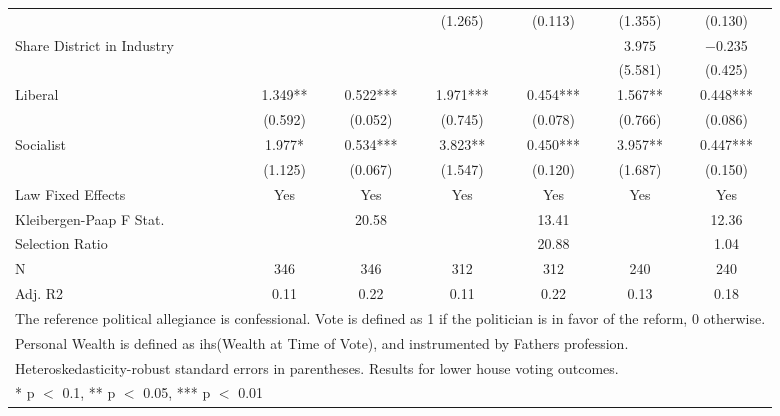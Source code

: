 \begin{table}[!h]
{\begin{tabular}[t]{lcccccc}
 &  &  & (\num{1.265}) & (\num{0.113}) & (\num{1.355}) & (\num{0.130})\\
Share District in Industry &  &  &  &  & \num{3.975} & \num{-0.235}\\
 &  &  &  &  & (\num{5.581}) & (\num{0.425})\\
Liberal & \num{1.349}** & \num{0.522}*** & \num{1.971}*** & \num{0.454}*** & \num{1.567}** & \num{0.448}***\\
 & (\num{0.592}) & (\num{0.052}) & (\num{0.745}) & (\num{0.078}) & (\num{0.766}) & (\num{0.086})\\
Socialist & \num{1.977}* & \num{0.534}*** & \num{3.823}** & \num{0.450}*** & \num{3.957}** & \num{0.447}***\\
 & (\num{1.125}) & (\num{0.067}) & (\num{1.547}) & (\num{0.120}) & (\num{1.687}) & (\num{0.150})\\
\midrule
Law Fixed Effects & Yes & Yes & Yes & Yes & Yes & Yes\\
Kleibergen-Paap F Stat. &  & 20.58 &  & 13.41 &  & 12.36\\
Selection Ratio &  &  &  & 20.88 &  & 1.04\\
N & \num{346} & \num{346} & \num{312} & \num{312} & \num{240} & \num{240}\\
Adj. R2 & \num{0.11} & \num{0.22} & \num{0.11} & \num{0.22} & \num{0.13} & \num{0.18}\\
\bottomrule
\multicolumn{7}{l}{\rule{0pt}{1em}The reference political allegiance is confessional. Vote is defined as 1 if the politician is in favor of the reform, 0 otherwise.}\\
\multicolumn{7}{l}{\rule{0pt}{1em}Personal Wealth is defined as ihs(Wealth at Time of Vote), and instrumented by Fathers profession.}\\
\multicolumn{7}{l}{\rule{0pt}{1em}Heteroskedasticity-robust standard errors in parentheses. Results for lower house voting outcomes.}\\
\multicolumn{7}{l}{\rule{0pt}{1em}* p $<$ 0.1, ** p $<$ 0.05, *** p $<$ 0.01}\\
\end{tabular}}
\end{table}
